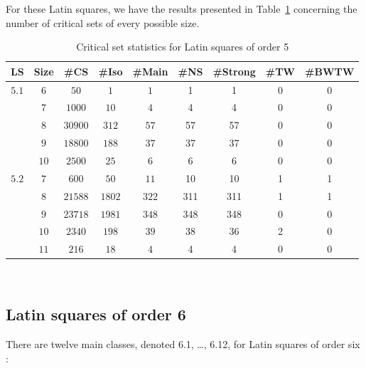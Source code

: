 \documentclass[12pt]{report}
\begin{document}
For these Latin squares, we have the results presented in Table~\ref{three} concerning the number
of critical sets of every possible size.

\begin{table}
\begin{center}
\caption{Critical set statistics for Latin squares of order 5}
\label{three}
\begin{tabular}{|c|c|c|c|c|c|c|c|c|} \hline
 LS & Size & \#CS & 
\#Iso & \#Main & \#NS & \#Strong & \#TW & \#BWTW \\ \hline
$5.1$ & $6$  & $50$    & $1$    & $1$ & 1 & 1 & 0 & 0 \\
      & $7$  & $1000$  & $10$   & $4$ & 4 & 4  & 0 & 0 \\
      & $8$  & $30900$ & $312$  & $57$ & 57 & 57 & 0 & 0 \\
      & $9$  & $18800$ & $188$  & $37$ & 37 & 37 & 0 & 0 \\
      & $10$ & $2500$  & $25$   & $6$ & 6 & 6 & 0 & 0 \\ \hline
$5.2$ & $7$  & $600$   & $50$   & $11$ & 10 & 10 & 1 & 1 \\
      & $8$  & $21588$ & $1802$ & $322$ & 311 & 311 & 1 & 1 \\
      & $9$  & $23718$ & $1981$ & $348$ & 348 & 348 & 0 & 0 \\
      & $10$ & $2340$  & $198$  & $39$ & 38 & 36 & 2 & 0 \\
      & $11$ & $216$   & $18$   & $4$ & 4 & 4 & 0 & 0 \\ \hline
\end{tabular}\vspace {3mm} \\
\end{center}
\end{table}

\subsection{Latin squares of order 6}
There are twelve main classes, denoted 6.1, \dots, 6.12, for Latin squares of order six \cite{crc}:
\end{document}
